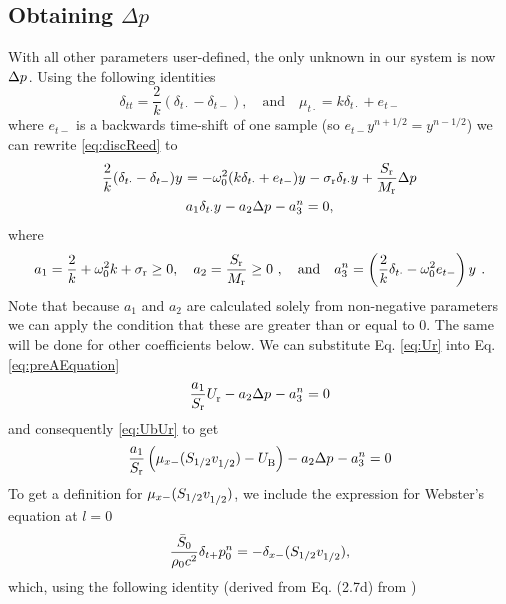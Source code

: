 \subsection{Obtaining $\Delta p$}\label{sec:obtainingDeltaP}
With all other parameters user-defined, the only unknown in our system is now $\Delta p^{}$. Using the following identities
\begin{equation}
    \delta_{tt} = \frac{2}{k}(\delta_{t\cdot} - \delta_{t-}), \quad \text{and} \quad \mu_{t\cdot} = k\delta_{t\cdot} + e_{t-}
\end{equation}
where $e_{t-}$ is a backwards time-shift of one sample (so $e_{t-}y^{n+1/2} = y^{n-1/2}$) we can rewrite \eqref{eq:discReed} to
\begin{gather}
    \frac{2}{k} (\delta_{t\cdot} - \delta_{t-})y^{} = -\omega_0^2(k\delta_{t\cdot} + e_{t-})y^{} - \sigma_\text{r}\delta_{t\cdot} y^{} + \frac{S_\text{r}}{M_\text{r}}\Delta p^{}\nonumber\\
    a_1\delta_{t\cdot}y^{} - a_2\Delta p^{} - a_3^n = 0,\label{eq:preAEquation}
\end{gather}
where
\begin{equation}\label{eq:aCoeffs}
    a_1 = \frac{2}{k} + \omega_0^2k + \sigma_\text{r} \geq 0, \quad a_2 = \frac{S_\text{r}}{M_\text{r}} \geq 0\ , \quad \text{and} \quad a_3^n = \left(\frac{2}{k} \delta_{t\cdot} - \omega_0^2e_{t-}\right)y^{\nph}\ .
\end{equation}
Note that because $a_1$ and $a_2$ are calculated solely from non-negative parameters we can apply the condition that these are greater than or equal to 0. The same will be done for other coefficients below.
We can substitute Eq. \eqref{eq:Ur} into Eq. \eqref{eq:preAEquation}
\begin{equation}
    \frac{a_1}{S_\text{r}}U_\text{r}^{} - a_2 \Delta p^{} - a_3^n = 0
\end{equation}
and consequently \eqref{eq:UbUr} to get
\begin{equation}\label{eq:aEquation}
    \frac{a_1}{S_\text{r}}\left(\mu_{x-}(S_{1/2}v_{1/2}^{}) - U_\text{B}^{}\right) - a_2 \Delta p^{} - a_3^n = 0
\end{equation}
%
To get a definition for $\mu_{x-}(S_{1/2}v_{1/2}^{})$, we include the expression for Webster's equation at $l=0$
\begin{equation}
    \frac{\bar S_0}{\rho_0 c^2}\delta_{t+}p_0^n = -\delta_{x-}(S_{1/2}v_{1/2}^{}),
\end{equation}
which, using the following identity (derived from Eq. (2.7d) from \cite{Bilbao2009})

